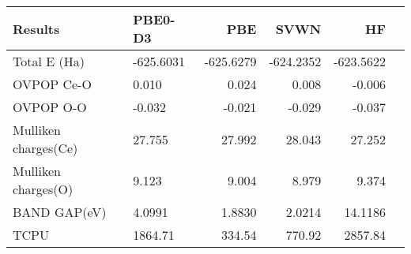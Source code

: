 \begin{tabular}{llrrrr}
\toprule
Results & PBE0-D3 & PBE & SVWN & HF \\
\midrule
Total E (Ha) & -625.6031 & -625.6279 & -624.2352 & -623.5622 \\
OVPOP Ce-O & 0.010 & 0.024 & 0.008 & -0.006 \\
OVPOP O-O & -0.032 & -0.021 & -0.029 & -0.037 \\
Mulliken charges(Ce) & 27.755 & 27.992 & 28.043 & 27.252 \\
Mulliken charges(O) & 9.123 & 9.004 & 8.979 & 9.374 \\
BAND GAP(eV) & 4.0991 & 1.8830 & 2.0214 & 14.1186 \\
TCPU & 1864.71 & 334.54 & 770.92 & 2857.84 \\
\bottomrule
\end{tabular}
